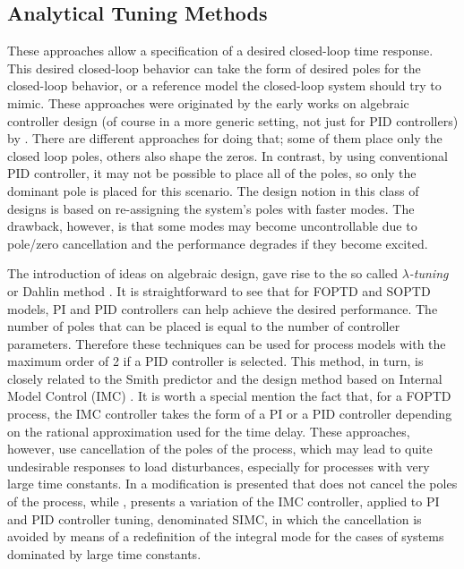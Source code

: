 \subsection{Analytical Tuning Methods}

These approaches allow a specification of a desired closed-loop time response. This desired closed-loop behavior can take the form of desired poles for the closed-loop behavior, or a reference model the closed-loop system should try to mimic.  These approaches were originated by the early works on algebraic controller design (of course in a more generic setting, not just for PID controllers) by \citep{ragazzini1958}. There are different approaches for doing that; some of them place only the closed loop poles, others also shape the zeros. In contrast, by using conventional PID controller, it may not be possible to place all of the poles, so only the dominant pole is placed for this scenario. The design notion in this class of designs is based on re-assigning the system's poles with faster modes. The drawback, however, is that some modes may become uncontrollable due to pole/zero cancellation and the performance degrades if they become excited.


The introduction of ideas on algebraic design, gave rise to the so called \emph{$\lambda$-tuning} or  Dahlin method \citep{dahlin68}. It is straightforward to see that for FOPTD and  SOPTD models, PI and PID
controllers can help achieve the desired performance. The number of poles that can be placed is equal to the number of controller parameters. Therefore these techniques can be used for process models with the maximum order of 2 if a PID controller is selected. This method, in turn, is closely related to the Smith predictor and the design method based on Internal Model Control (IMC) \citep{riveraetall86}.  It is worth a special mention the fact that, for a FOPTD process, the IMC controller takes the form of a PI or a PID controller depending on the rational approximation used for the time delay.  These approaches, however, use cancellation of the poles of the process, which may lead to quite undesirable responses to load disturbances, especially for processes with very large time constants. In \citet{chien90} a modification is presented  that does not cancel the poles of the process, while \citet{Skogestad2003}, presents a variation of the IMC controller, applied to PI and PID controller tuning, denominated SIMC, in which the cancellation is avoided by means of a redefinition of the integral mode for the cases of systems dominated by large time constants. 

